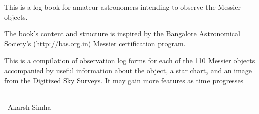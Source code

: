 This is a log book for amateur astronomers intending to observe the
Messier objects.

The book's content and structure is inspired by the Bangalore
Astronomical Society's (\url{http://bas.org.in}) Messier certification
program.

This is a compilation of observation log forms for each of the 110
Messier objects accompanied by useful information about the object, a
star chart, and an image from the Digitized Sky Surveys. It may gain
more features as time progresses

\\

\hfill --Akarsh Simha
